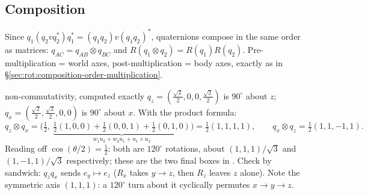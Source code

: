 \subsection{Composition}\label{sec:rot:composition}
Since $q_1(q_2vq_2^*)q_1^*=(q_1q_2)v(q_1q_2)^*$, quaternions compose in the same order as matrices: $q_{AC}=q_{AB}\otimes q_{BC}$ and $R(q_1\otimes q_2)=R(q_1)R(q_2)$. Pre-multiplication = world axes, post-multiplication = body axes, exactly as in \S\ref{sec:rot:composition-order-multiplication}.

\begin{example}{non-commutativity, computed exactly}
$q_z=(\tfrac{\sqrt2}2,0,0,\tfrac{\sqrt2}2)$ is $90^\circ$ about $z$; $q_x=(\tfrac{\sqrt2}2,\tfrac{\sqrt2}2,0,0)$ is $90^\circ$ about $x$. With the product formula:
\[
q_z\otimes q_x=\big(\tfrac12,\ \underbrace{\tfrac12(1,0,0)+\tfrac12(0,0,1)+\tfrac12(0,1,0)}_{w_1u_2+w_2u_1+u_1\times u_2}\big)=\tfrac12(1,1,1,1),\qquad q_x\otimes q_z=\tfrac12(1,1,-1,1).
\]
Reading off $\cos(\theta/2)=\frac12$: both are $120^\circ$ rotations, about $(1,1,1)/\sqrt3$ and $(1,-1,1)/\sqrt3$ respectively; these are the two final boxes in . Check by sandwich: $q_zq_x$ sends $e_y\mapsto e_z$ ($R_x$ takes $y\to z$, then $R_z$ leaves $z$ alone). Note the symmetric axis $(1,1,1)$: a $120^\circ$ turn about it cyclically permutes $x\to y\to z$.
\end{example}
